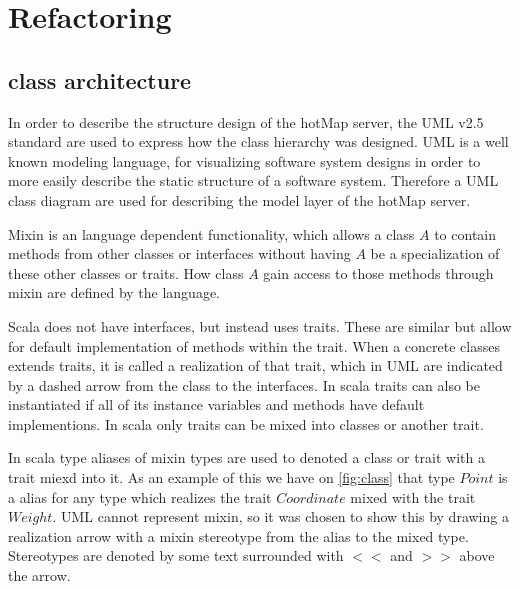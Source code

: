 \section{Refactoring} \label{sec:s4_refactoring}



\subsection{class architecture}
In order to describe the structure design of the hotMap server, the UML v2.5 standard are used to express how the class hierarchy was designed. UML is a well known modeling language, for visualizing software system designs in order to more easily describe the static structure of a software system.
Therefore a UML class diagram are used for describing the model layer of the hotMap server.

Mixin is an language dependent functionality, which allows a class $A$ to contain methods from other classes or interfaces without having $A$ be a specialization of these other classes or traits. How class $A$ gain access to those methods through mixin are defined by the language. 

Scala does not have interfaces, but instead uses traits. These are similar but allow for default implementation of methods within the trait. When a concrete classes extends traits, it is called a realization of that trait, which in UML are indicated by a dashed arrow from the class to the interfaces. In scala traits can also be instantiated if all of its instance variables and methods have default implementions. In scala only traits can be mixed into classes or another trait.


In scala type aliases of mixin types are used to denoted a class or trait with a trait miexd into it. As an example of this we have on \cref{fig:class} that type $Point$ is a alias for any type which realizes the trait $Coordinate$ mixed with the trait $Weight$. UML cannot represent mixin, so it was chosen to show this by drawing a realization arrow with a mixin stereotype from the alias to the mixed type. Stereotypes are denoted by some text surrounded with $<<$ and $>>$ above the arrow.

